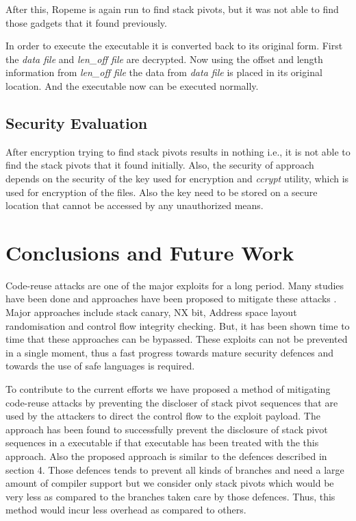 \documentclass{article}
\begin{document}
\begin{multicols}{2}
	After this, Ropeme\cite{ropeme} is again run to find stack pivots, but it was not able to find those gadgets that it found previously.
	
	In order to execute the executable it is converted back to its original form. First the \textit{data file} and \textit{len\_off file} are decrypted. Now using the offset and length information from \textit{len\_off file} the data from \textit{data file} is placed in its original location. And the executable now can be executed normally.
	
	\subsection{Security Evaluation}
	After encryption trying to find stack pivots results in nothing i.e., it is not able to find the stack pivots that it found initially. Also, the security of approach depends on the security of the key used for encryption and \textit{ccrypt} utility, which is used for encryption of the files. Also the key need to be stored on a secure location that cannot be accessed by any unauthorized means.

	\section{Conclusions and Future Work}
	Code-reuse attacks are one of the major exploits for a long period. Many studies have been done and approaches have been proposed to mitigate these attacks \cite{breakdef}\cite{secrvw}\cite{memerr}\cite{marlin}. Major approaches include stack canary, NX bit, Address space layout randomisation and control flow integrity checking. But, it has been shown time to time that these approaches can be bypassed. These exploits can not be prevented in a single moment, thus a fast progress towards mature security defences and towards the use of safe languages is required.
	
	To contribute to the current efforts we have proposed a method of mitigating code-reuse attacks by preventing the discloser of stack pivot sequences that are used by the attackers to direct the control flow to the exploit payload. The approach has been found to successfully prevent the disclosure of stack pivot sequences in a executable if that executable has been treated with the this approach. Also the proposed approach is similar to the defences described in section 4. Those defences tends to prevent all kinds of branches and need a large amount of compiler support but we consider only stack pivots which would be very less as compared to the branches taken care by those defences. Thus, this method would incur less overhead as compared to others.
	

\end{multicols}
\end{document}
